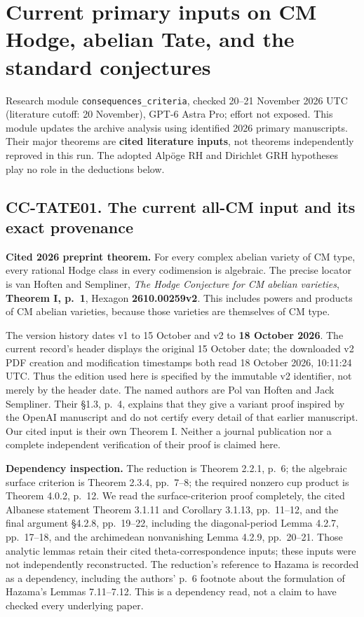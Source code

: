 \documentclass[11pt,a4paper]{article}
\theoremstyle{definition}\newtheorem{definition}[theorem]{Definition}
\theoremstyle{remark}\newtheorem{remark}[theorem]{Remark}
\begin{document}

\section{Current primary inputs on CM Hodge, abelian Tate, and the
standard
conjectures}\label{current-primary-inputs-on-cm-hodge-abelian-tate-and-the-standard-conjectures}

Research module \nolinkurl{consequences_criteria}, checked 20--21 November
2026 UTC (literature cutoff: 20 November), GPT-6 Astra Pro; effort not
exposed. This module updates the archive analysis using identified 2026
primary manuscripts. Their major theorems are \textbf{cited literature
inputs}, not theorems independently reproved in this run. The adopted
Alpöge RH and Dirichlet GRH hypotheses play no role in the deductions
below.

\subsection{CC-TATE01. The current all-CM input and its exact
provenance}\label{cc-tate01.-the-current-all-cm-input-and-its-exact-provenance}

\textbf{Cited 2026 preprint theorem.} For every complex abelian variety
of CM type, every rational Hodge class in every codimension is
algebraic. The precise locator is van Hoften and Sempliner, \emph{The
Hodge Conjecture for CM abelian varieties}, \textbf{Theorem I, p.~1},
Hexagon \textbf{2610.00259v2}. This includes powers and products of CM
abelian varieties, because those varieties are themselves of CM type.

The version history dates v1 to 15 October and v2 to \textbf{18 October
2026}. The current record's header displays the original 15 October
date; the downloaded v2 PDF creation and modification timestamps both
read 18 October 2026, 10:11:24 UTC. Thus the edition used here is
specified by the immutable v2 identifier, not merely by the header date.
The named authors are Pol van Hoften and Jack Sempliner. Their §1.3,
p.~4, explains that they give a variant proof inspired by the OpenAI
manuscript and do not certify every detail of that earlier manuscript.
Our cited input is their own Theorem I. Neither a journal publication
nor a complete independent verification of their proof is claimed here.

\textbf{Dependency inspection.} The reduction is Theorem 2.2.1, p.~6;
the algebraic surface criterion is Theorem 2.3.4, pp.~7--8; the required
nonzero cup product is Theorem 4.0.2, p.~12. We read the
surface-criterion proof completely, the cited Albanese statement Theorem
3.1.11 and Corollary 3.1.13, pp.~11--12, and the final argument §4.2.8,
pp.~19--22, including the diagonal-period Lemma 4.2.7, pp.~17--18, and
the archimedean nonvanishing Lemma 4.2.9, pp.~20--21. Those analytic
lemmas retain their cited theta-correspondence inputs; these inputs were
not independently reconstructed. The reduction's reference to Hazama is
recorded as a dependency, including the authors' p.~6 footnote about the
formulation of Hazama's Lemmas 7.11--7.12. This is a dependency read,
not a claim to have checked every underlying paper.
\end{document}
